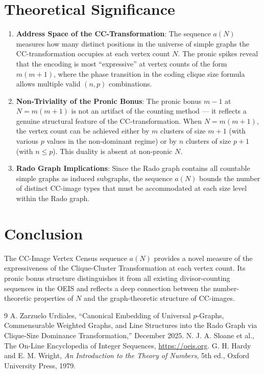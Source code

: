 \documentclass[11pt,a4paper]{article}
\theoremstyle{definition}
\begin{document}
\section{Theoretical Significance}

\begin{enumerate}
\item \textbf{Address Space of the CC-Transformation}: The sequence $a(N)$ measures how many distinct positions in the universe of simple graphs the CC-transformation occupies at each vertex count $N$. The pronic spikes reveal that the encoding is most ``expressive'' at vertex counts of the form $m(m+1)$, where the phase transition in the coding clique size formula allows multiple valid $(n, p)$ combinations.

\item \textbf{Non-Triviality of the Pronic Bonus}: The pronic bonus $m - 1$ at $N = m(m+1)$ is not an artifact of the counting method --- it reflects a genuine structural feature of the CC-transformation. When $N = m(m+1)$, the vertex count can be achieved either by $m$ clusters of size $m + 1$ (with various $p$ values in the non-dominant regime) or by $n$ clusters of size $p + 1$ (with $n \leq p$). This duality is absent at non-pronic $N$.

\item \textbf{Rado Graph Implications}: Since the Rado graph contains all countable simple graphs as induced subgraphs, the sequence $a(N)$ bounds the number of distinct CC-image types that must be accommodated at each size level within the Rado graph.
\end{enumerate}

\section{Conclusion}

The CC-Image Vertex Census sequence $a(N)$ provides a novel measure of the expressiveness of the Clique-Cluster Transformation at each vertex count. Its pronic bonus structure distinguishes it from all existing divisor-counting sequences in the OEIS and reflects a deep connection between the number-theoretic properties of $N$ and the graph-theoretic structure of CC-images.

\begin{thebibliography}{9}
 A. Zarzuelo Urdiales, ``Canonical Embedding of Universal $p$-Graphs, Commensurable Weighted Graphs, and Line Structures into the Rado Graph via Clique-Size Dominance Transformation,'' December 2025.
 N. J. A. Sloane et al., The On-Line Encyclopedia of Integer Sequences, \url{https://oeis.org}.
 G. H. Hardy and E. M. Wright, \textit{An Introduction to the Theory of Numbers}, 5th ed., Oxford University Press, 1979.
\end{thebibliography}
\end{document}
